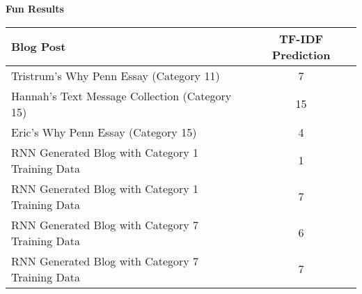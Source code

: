 \documentclass{article}
\begin{document}
\textbf{Fun Results}
\begin{table}[h!]
\begin{tabular}{|l|c|}
\hline
Blog Post                                        & TF-IDF Prediction \\ \hline
Tristrum's Why Penn Essay (Category 11)          & 7                 \\ \hline
Hannah's Text Message Collection (Category 15)   & 15                \\ \hline
Eric's Why Penn Essay (Category 15)              & 4                 \\ \hline
RNN Generated Blog with Category 1 Training Data & 1                 \\ \hline
RNN Generated Blog with Category 1 Training Data & 7                 \\ \hline
RNN Generated Blog with Category 7 Training Data & 6                 \\ \hline
RNN Generated Blog with Category 7 Training Data & 7                 \\ \hline
\end{tabular}
\end{table}
\end{document}
